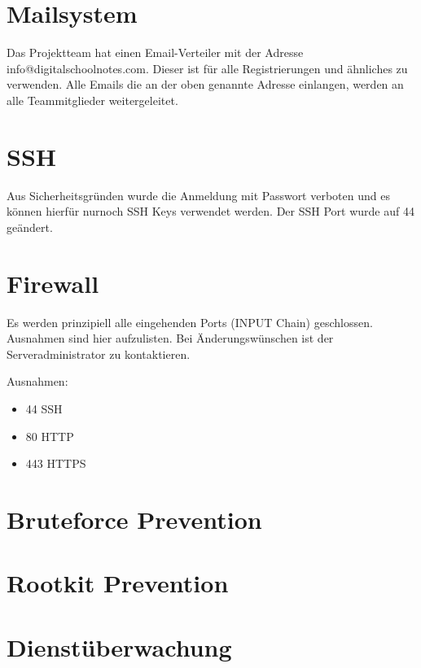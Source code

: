 \documentclass[12pt,a4paper,oneside,ngerman]{scrartcl}
\begin{document}
\section{Mailsystem}
Das Projektteam hat einen Email-Verteiler mit der Adresse info@digitalschoolnotes.com. Dieser ist für alle Registrierungen und ähnliches zu verwenden. Alle Emails die an der oben genannte Adresse einlangen, werden an alle Teammitglieder weitergeleitet.

\section{SSH}
Aus Sicherheitsgründen wurde die Anmeldung mit Passwort verboten und es können hierfür nurnoch SSH Keys verwendet werden. Der SSH Port wurde auf 44 geändert.

\section{Firewall}
Es werden prinzipiell alle eingehenden Ports (INPUT Chain) geschlossen. Ausnahmen sind hier aufzulisten. Bei Änderungswünschen ist der Serveradministrator zu kontaktieren.

Ausnahmen:
\begin{itemize}
\item 44	SSH
\item 80	HTTP
\item 443	HTTPS
\end{itemize}
\section{Bruteforce Prevention}
\section{Rootkit Prevention}
\section{Dienstüberwachung}



 



\end{document}
